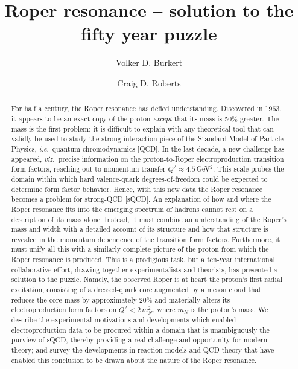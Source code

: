 \documentclass[rmp, aps, floatfix, nofootinbib, twocolumn]{revtex4-1}
\begin{document}
\title{Roper resonance -- solution to the fifty year puzzle}

\author{Volker D. Burkert}

\author{Craig D. Roberts}

\renewcommand{\baselinestretch}{1.1}

\begin{abstract}
For half a century, the Roper resonance has defied understanding.  Discovered in 1963, it appears to be an exact copy of the proton \emph{except} that its mass is 50\% greater.
%
The mass is the first problem: it is difficult to explain with any theoretical tool that can validly be used to study the strong-interaction piece of the Standard Model of Particle Physics, \emph{i.e}.\ quantum chromodynamics [QCD].
%
In the last decade, a new challenge has appeared, \emph{viz}.\ precise information on the proton-to-Roper electroproduction transition form factors, reaching out to momentum transfer $Q^2 \approx 4.5\,$GeV$^2$.  This scale probes the domain within which hard valence-quark degrees-of-freedom could be expected to determine form factor behavior.  Hence, with this new data the Roper resonance becomes a problem for strong-QCD [sQCD].
%
An explanation of how and where the Roper resonance fits into the emerging spectrum of hadrons cannot rest on a description of its mass alone.  Instead, it must combine an understanding of the Roper's mass and width with a detailed account of its structure and how that structure is revealed in the momentum dependence of the transition form factors.  Furthermore, it must unify all this with a similarly complete picture of the proton from which the Roper resonance is produced.
%
This is a prodigious task, but a ten-year international collaborative effort, drawing together experimentalists and theorists, has presented a solution to the puzzle.  Namely, the observed Roper is at heart the proton's first radial excitation, consisting of a dressed-quark core augmented by a meson cloud that reduces the core mass by approximately 20\% and materially alters its electroproduction form factors on $Q^2 < 2\,m_N^2$, where $m_N$ is the proton's mass.
%
We describe the experimental motivations and developments which enabled electroproduction data to be procured within a domain that is unambiguously the purview of sQCD, thereby providing a real challenge and opportunity for modern theory; and survey the developments in reaction models and QCD theory that have enabled this conclusion to be drawn about the nature of the Roper resonance.
%
\end{abstract}
\end{document}
